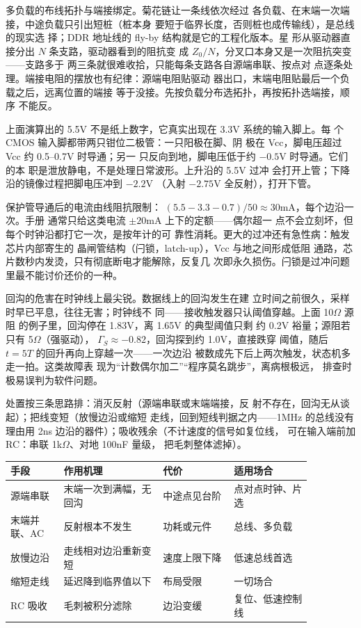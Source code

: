多负载的布线拓扑与端接绑定。菊花链让一条线依次经过
各负载、在末端一次端接，中途负载只引出短桩（桩本身
要短于临界长度，否则桩也成传输线），是总线的现实选
择；DDR 地址线的 fly-by 结构就是它的工程化版本。星
形从驱动器直接分出 $N$ 条支路，驱动器看到的阻抗变
成 $Z_0/N$，分叉口本身又是一次阻抗突变——支路多于
两三条就很难收拾，只能每条支路各自源端串联、按点对
点逐条处理。端接电阻的摆放也有纪律：源端电阻贴驱动
器出口，末端电阻贴最后一个负载之后，远离位置的端接
等于没接。先按负载分布选拓扑，再按拓扑选端接，顺序
不能反。

上面演算出的 5.5V
不是纸上数字，它真实出现在 3.3V 系统的输入脚上。每
个 CMOS 输入脚都带两只钳位二极管：一只阳极在脚、阴
极在 Vcc，脚电压超过 Vcc 约 0.5--0.7V 时导通；另一
只反向到地，脚电压低于约 $-0.5$V 时导通。它们的本
职是泄放静电，不是处理日常波形。上升沿的 5.5V 过冲
会打开上管；下降沿的镜像过程把脚电压冲到 $-2.2$V
（入射 $-2.75$V 全反射），打开下管。

保护管导通后的电流由线阻抗限制：
$(5.5-3.3-0.7)/50\approx30$mA，每个边沿一次。手册
通常只给这类电流 $\pm20$mA 上下的定额——偶尔超一
点不会立刻坏，但每个时钟沿都打它一次，是按年计的可
靠性消耗。更大的过冲还有急性病：触发芯片内部寄生的
晶闸管结构（闩锁，latch-up），Vcc 与地之间形成低阻
通路，芯片数秒内发烫，只有彻底断电才能解除，反复几
次即永久损伤。闩锁是过冲问题里最不能讨价还价的一种。

回沟的危害在时钟线上最尖锐。数据线上的回沟发生在建
立时间之前很久，采样时早已平息，往往无害；时钟线不
同——接收触发器只认阈值穿越。上面 10$\Omega$ 源阻
的例子里，回沟停在 1.83V，离 1.65V 的典型阈值只剩
约 0.2V 裕量；源阻若只有 5$\Omega$（强驱动），
$\Gamma_S\approx-0.82$，回沟探到约 1.0V，直接跌穿
阈值，随后 $t=5T$ 的回升再向上穿越一次——一次边沿
被数成先下后上两次触发，状态机多走一拍。这类故障表
现为“计数偶尔加二”“程序莫名跳步”，离病根极远，
排查时极易误判为软件问题。

处置按三条思路排：消灭反射（源端串联或末端端接，反
射不存在，回沟无从谈起）；把线变短（放慢边沿或缩短
走线，回到短线判据之内——1MHz 的总线没有理由用
2ns 边沿的器件）；吸收残余（不计速度的信号如复位线，
可在输入端前加 RC：串联 1k$\Omega$、对地 100nF 量级，
把毛刺整体滤掉）。

\begin{longtable}{L{0.15\linewidth}L{0.29\linewidth}L{0.2\linewidth}L{0.22\linewidth}}
\toprule
手段 & 作用机理 & 代价 & 适用场合 \\
\midrule
源端串联 & 末端一次到满幅，无回沟 & 中途点见台阶 & 点对点时钟、片选 \\\tablerowrule
末端并联、AC & 反射根本不发生 & 功耗或元件 & 总线、多负载 \\\tablerowrule
放慢边沿 & 走线相对边沿重新变短 & 速度上限下降 & 低速总线首选 \\\tablerowrule
缩短走线 & 延迟降到临界值以下 & 布局受限 & 一切场合 \\\tablerowrule
RC 吸收 & 毛刺被积分滤除 & 边沿变缓 & 复位、低速控制线 \\
\bottomrule
\end{longtable}

